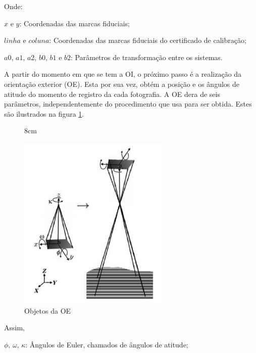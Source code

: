 Onde:

$x$ e $y$: Coordenadas das marcas fiduciais;

$linha$ e $coluna$: Coordenadas das marcas fiduciais do certificado de calibração;

$a0$, $a1$, $a2$, $b0$, $b1$ e $b2$: Parâmetros de transformação entre os sistemas.

A partir do momento em que se tem a OI, o próximo passo é a realização da orientação exterior (OE). Esta por sua vez, obtém a posição e os ângulos de atitude do momento de registro da cada fotografia. A OE dera de seis parâmetros, independentemente do procedimento que usa para ser obtida. Estes são ilustrados na figura \ref{atitude}.

\begin{figure}[!ht]{8cm}
  \caption{Objetos da OE} \label{atitude}
  \centering
  \includegraphics[width=1\hsize]{figuras/atitude.png}
\end{figure}

Assim,

$\phi$, $\omega$, $\kappa$: Ângulos de Euler, chamados de ângulos de atitude;

